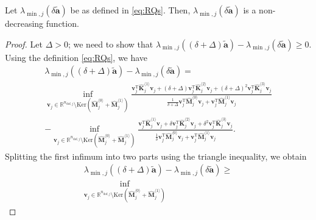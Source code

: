 \documentclass[10pt,a4paper]{amsart}
\begin{document}
\begin{proposition}\label{prop:monotonic}
Let $\lambda_{\min,j}(\delta \tilde{\mathbf{a}})$ be as defined in \eqref{eq:RQs}. Then, $\lambda_{\min,j}(\delta \tilde{\mathbf{a}})$ is a non-decreasing function.
\begin{proof}
Let $\Delta > 0$; we need to show that $\lambda_{\min,j}((\delta+\Delta) \tilde{\mathbf{a}}) - \lambda_{\min,j}(\delta \tilde{\mathbf{a}})\ge 0$. Using the definition \eqref{eq:RQs}, we have %
\begin{multline}
	\lambda_{\min,j}((\delta + \Delta)\tilde{\mathbf{a}}) - \lambda_{\min,j}(\delta \tilde{\mathbf{a}})=\\
	\inf_{\mathbf{v}_j \in \mathbb{R}^{n_{\mathrm{dof},j}}\setminus \mathrm{Ker}\left(\hat{\mathbf{M}}_j^{\langle 0\rangle}+\hat{\mathbf{M}}_j^{\langle 1\rangle}\right)} 
	\frac{\mathbf{v}_j^\mathrm{T} \hat{\mathbf{K}}_j^{\langle 1\rangle}\mathbf{v}_j + (\delta+\Delta) \mathbf{v}_j^\mathrm{T}\hat{\mathbf{K}}_j^{\langle 2\rangle} \mathbf{v}_j + (\delta+\Delta)^2 \mathbf{v}_j^\mathrm{T}\hat{\mathbf{K}}_j^{\langle 3\rangle} \mathbf{v}_j}{\frac{1}{\delta + \Delta }\mathbf{v}_j^\mathrm{T} \hat{\mathbf{M}}_j^{\langle 0\rangle} \mathbf{v}_j + \mathbf{v}_j^\mathrm{T} \hat{\mathbf{M}}_j^{\langle 1\rangle} \mathbf{v}_j} \\
	- \inf_{\mathbf{v}_j \in \mathbb{R}^{n_{\mathrm{dof},j}}\setminus \mathrm{Ker}\left(\hat{\mathbf{M}}_j^{\langle 0\rangle}+\hat{\mathbf{M}}_j^{\langle 1\rangle}\right)} \frac{\mathbf{v}_j^\mathrm{T} \hat{\mathbf{K}}_j^{\langle 1\rangle}\mathbf{v}_j + \delta \mathbf{v}_j^\mathrm{T}\hat{\mathbf{K}}_j^{\langle 2\rangle} \mathbf{v}_j + \delta^2 \mathbf{v}_j^\mathrm{T}\hat{\mathbf{K}}_j^{\langle 3\rangle} \mathbf{v}_j}{\frac{1}{\delta}\mathbf{v}_j^\mathrm{T} \hat{\mathbf{M}}_j^{\langle 0\rangle} \mathbf{v}_j + \mathbf{v}_j^\mathrm{T} \hat{\mathbf{M}}_j^{\langle 1\rangle} \mathbf{v}_j}.
\end{multline}
%
Splitting the first infimum into two parts using the triangle inequality, we obtain 
%
\begin{multline}\label{eq:lamdiff}
	\lambda_{\min,j}((\delta + \Delta)\tilde{\mathbf{a}}) - \lambda_{\min,j}(\delta \tilde{\mathbf{a}})\ge\\
	\inf_{\mathbf{v}_j \in \mathbb{R}^{n_{\mathrm{dof},j}}\setminus \mathrm{Ker}\left(\hat{\mathbf{M}}_j^{\langle 0\rangle}+\hat{\mathbf{M}}_j^{\langle 1\rangle}\right)} 

\end{multline}
\end{proof}
\end{proposition}
\end{document}
